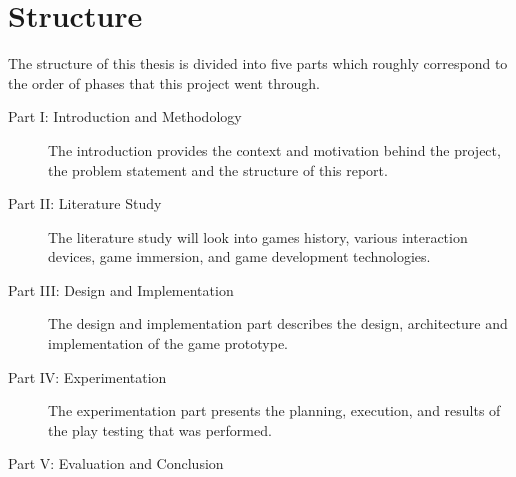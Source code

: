 \section{Structure}
The structure of this thesis is divided into five parts which roughly correspond to the order of phases that this project went through.
\begin{description}
	\item[Part I: Introduction and Methodology]
	The introduction provides the context and motivation behind the project, the problem statement and the structure of this report.
	
	\item[Part II: Literature Study]
	The literature study will look into games history, various interaction devices, game immersion, and game development technologies.
	
	\item[Part III: Design and Implementation]
	The design and implementation part describes the design, architecture and implementation of the game prototype.
	
	\item[Part IV: Experimentation]
	The experimentation part presents the planning, execution, and results of the play testing that was performed.
	
	\item[Part V: Evaluation and Conclusion]
	
\end{description}
